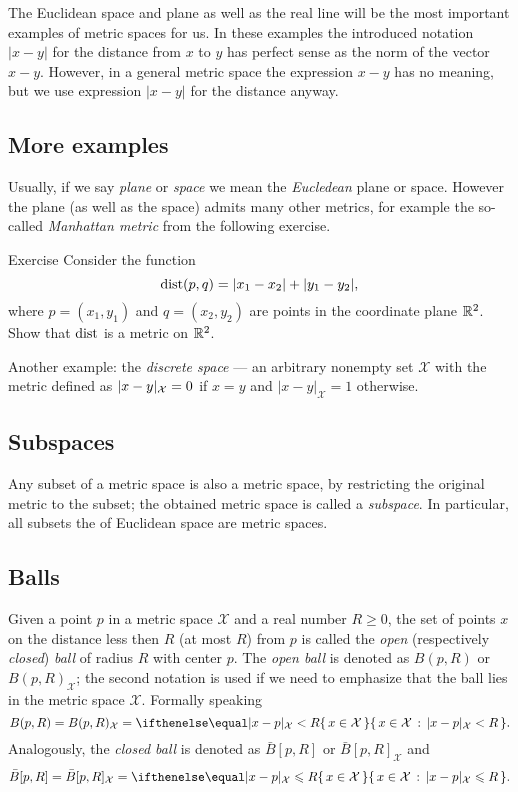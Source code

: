 The Euclidean space and plane as well as the real line will be the most important examples of metric spaces for us.
In these examples the introduced notation $|x-y|$ for the distance from $x$ to $y$ has perfect sense as the norm of the vector $x-y$.
However, in a general metric space the expression $x-y$ has no meaning, but we use expression $|x-y|$ for the distance anyway.

\subsection*{More examples}

Usually, if we say {}\emph{plane} or {}\emph{space} we mean the {}\emph{Eucledean} plane or space.
However the plane (as well as the space) admits many other metrics, for example the so-called \emph{Manhattan metric} from the following exercise.

\begin{thm}{Exercise}\label{ex:ell-infty}
Consider the function
$$\mathop{\rm dist}\nolimits(p,q)=|x_1-x_2|+|y_1-y_2|,$$
where $p=(x_1,y_1)$ and $q=(x_2,y_2)$ are points in the coordinate plane $\mathbb{R}^2$.
Show that $\mathop{\rm dist}\nolimits$ is a metric on $\mathbb{R}^2$.
\end{thm}

Another example: the \emph{discrete space} --- an arbitrary nonempty set $\mathcal X$ with the metric defined as $|x\z-y|_{\mathcal X}=0$ if $x=y$ and $|x-y|_{\mathcal X}=1$ otherwise.

\subsection*{Subspaces}
Any subset of a metric space is also a metric space, by restricting the original metric to the subset;
the obtained metric space is called a \emph{subspace}.
In particular, all subsets the of Euclidean space are metric spaces.

\subsection*{Balls}
Given a point $p$ in a metric space ${\mathcal X}$ and a real number $R\ge 0$, the set of points $x$ on the distance less then $R$ (at most $R$) from $p$ is called the \emph{open} (respectively \emph{closed}) \emph{ball} of radius $R$ with center $p$.
The {}\emph{open ball} is denoted as $B(p,R)$ or $B(p,R)_{\mathcal X}$;
the second notation is used if we need to emphasize that the ball lies in the metric space $\mathcal X$.
Formally speaking
\[B(p,R)=B(p,R)_{\mathcal X}=\set{x\in \mathcal X}{|x-p|_{\mathcal X}< R}.\]
Analogously, the {}\emph{closed ball} is denoted as $\bar B[p,R]$ or $\bar B[p,R]_{\mathcal X}$ and
\[\bar B[p,R]=\bar B[p,R]_{\mathcal X}=\set{x\in \mathcal X}{|x-p|_{\mathcal X}\le R}.\]

